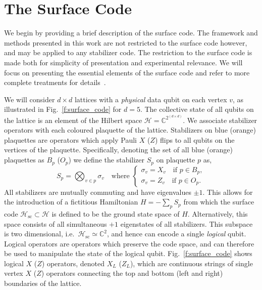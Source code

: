 \documentclass[twocolumn,preprintnumbers,amsmath,amssymb,notitlepage,nofootinbib,longbibliography,superscriptaddress,aps,pra,10pt]{revtex4-1}
\begin{document}
\section{The Surface Code}\label{s:the_surface_code}

	We begin by providing a brief description of the surface code.
	The framework and methods presented in this work are not restricted to the surface code however, and may be applied to any stabilizer code.
	The restriction to the surface code is made both for simplicity of presentation and experimental relevance.
	We will focus on presenting the essential elements of the surface code and refer to more complete treatments for details~\cite{Gottesman97, Terhal15,Litinski18b}.

	We will consider $d\times d$ lattices with a \textit{physical} data qubit on each vertex $v$, as illustrated in Fig.~\ref{f:surface_code} for $d=5$.
	The collective state of all qubits on the lattice is an element of the Hilbert space $\mathcal{H} = \mathbb{C}^{2^{(d\times d)}}$.
	We associate stabilizer operators with each coloured plaquette of the lattice.
	Stabilizers on blue (orange) plaquettes are operators which apply Pauli $X$ ($Z$) flips to all qubits on the vertices of the plaquette.
	Specifically, denoting the set of all blue (orange) plaquettes as $B_p$ ($O_p$) we define the stabilizer $S_p$ on plaquette $p$ as,
	\begin{equation}\label{e:stabilizer_definition}
		S_p = \bigotimes_{v\in p} \sigma_v \quad \text{where }
		\begin{cases}
			\sigma_v = X_v \quad \text{if } p \in B_p,\\
			\sigma_v = Z_v \quad \text{if } p \in O_p.
		\end{cases}
	\end{equation}
	All stabilizers are mutually commuting and have eigenvalues $\pm 1$.
	This allows for the introduction of a fictitious Hamiltonian $H = -\sum_p S_p$ from which the surface code $\mathcal{H}_\mathrm{sc} \subset \mathcal{H}$ is defined to be the ground state space of $H$.
	Alternatively, this space consists of all simultaneous $+1$ eigenstates of all stabilizers.
	This subspace is two dimensional, i.e.\ $\mathcal{H}_\mathrm{sc} \simeq \mathbb{C}^2$, and hence can encode a single \textit{logical} qubit.
	Logical operators are operators which preserve the code space, and can therefore be used to manipulate the state of the logical qubit.
	Fig.~\ref{f:surface_code} shows logical $X$ ($Z$) operators, denoted $X_L$ ($Z_L$), which are continuous strings of single vertex $X$ ($Z$) operators connecting the top and bottom (left and right) boundaries of the lattice.
	
\end{document}
